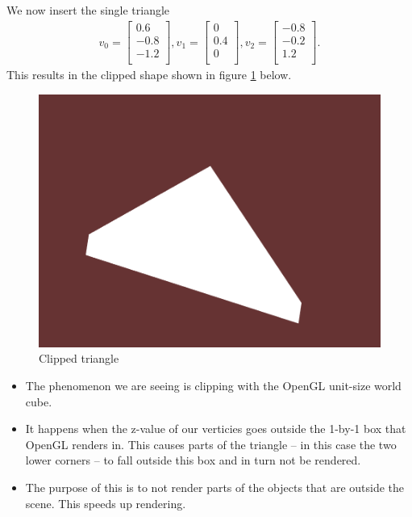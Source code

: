 \documentclass[]{article}
\begin{document}
\begin{multicols}{2}
\section{}
\subsection{}
We now insert the single triangle
\begin{equation}\begin{aligned}
v_0 =
\begin{bmatrix}
0.6 \\
-0.8 \\
-1.2 \\
\end{bmatrix},
v_1 =
\begin{bmatrix}
0 \\
0.4 \\
0 \\
\end{bmatrix},
v_2 =
\begin{bmatrix}
-0.8 \\
-0.2 \\
1.2 \\
\end{bmatrix}.
\end{aligned}\end{equation}
This results in the clipped shape shown in figure \ref{fig:clippedtri} below.
\begin{figure}[H]
\centering
\includegraphics[width=0.5\columnwidth]{clippedtri.png}
\caption{Clipped triangle}
\label{fig:clippedtri}
\end{figure}

\begin{itemize}
\item The phenomenon we are seeing is clipping with the OpenGL unit-size world cube.
\item It happens when the z-value of our verticies goes outside the 1-by-1 box that OpenGL renders in. This causes parts of the triangle – in this case the two lower corners – to fall outside this box and in turn not be rendered.
\item The purpose of this is to not render parts of the objects that are outside the scene. This speeds up rendering.
\end{itemize}


\end{multicols}
\end{document}
